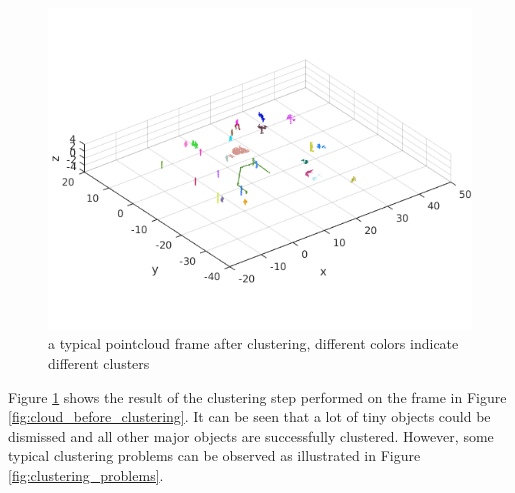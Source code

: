 \begin{figure}[H]
\centering
\includegraphics[width = .9\textwidth]{include/images/cloud_after_clustering.png}
\caption{a typical pointcloud frame after clustering, different colors indicate different clusters}
\label{fig:cloud_after_clustering}
\end{figure}

Figure \ref{fig:cloud_after_clustering} shows the result of the clustering step performed on the frame in Figure \ref{fig:cloud_before_clustering}. It can be seen that a lot of tiny objects could be dismissed and all other major objects are successfully clustered. However, some typical clustering problems can be observed as illustrated in Figure \ref{fig:clustering_problems}.


